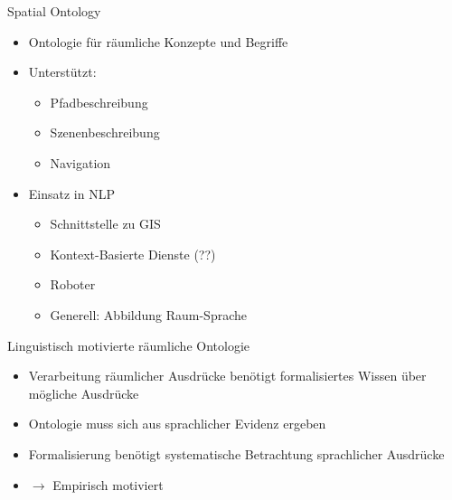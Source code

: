 \documentclass[12pt,a4paper]{beamer}
\begin{document}
\begin{frame}{Spatial Ontology}
\begin{itemize}
\item Ontologie für räumliche Konzepte und Begriffe
\item Unterstützt:
\begin{itemize}
    \item Pfadbeschreibung
    \item Szenenbeschreibung
    \item Navigation
\end{itemize}
\item Einsatz in NLP
\begin{itemize}
    \item Schnittstelle zu GIS
    \item Kontext-Basierte Dienste (??)
    \item Roboter
    \item Generell: Abbildung Raum-Sprache
\end{itemize}
\end{itemize}
\end{frame}





\begin{frame}{Linguistisch motivierte räumliche Ontologie}
\begin{itemize}
\item Verarbeitung räumlicher Ausdrücke benötigt formalisiertes Wissen über mögliche Ausdrücke
\item Ontologie muss sich aus sprachlicher Evidenz ergeben
\item Formalisierung benötigt systematische Betrachtung sprachlicher Ausdrücke
\item $\to$ Empirisch motiviert
\end{itemize}

\end{frame}
\end{document}
